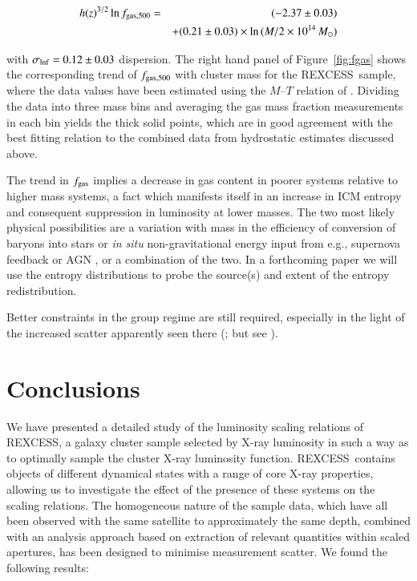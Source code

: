 \documentclass[oldversion]{aa}
\newcommand{\rexcess}{{\gwpfont REXCESS}}
\begin{document}
\begin{eqnarray*}
h(z)^{3/2} \ln{f_{\rm gas,500}} & = &(-2.37\pm0.03) \\
& & + (0.21\pm0.03) \times \ln{(M / 2\times10^{14}\, M_\odot})
\end{eqnarray*}

\noindent with $\sigma_{\rm lnf} = 0.12\pm0.03$ dispersion. The right hand panel of Figure~\ref{fig:fgas} shows the corresponding trend of $f_{\rm gas,500}$ with cluster mass for the \rexcess\ sample, where the data values have been estimated using the $M$--$T$ relation of \citet{app05}. Dividing the data into three mass bins and averaging the gas mass fraction measurements in each bin yields the thick solid points, which are in good agreement with the best fitting relation to the combined data from hydrostatic estimates discussed above. 

The trend in $f_{\rm gas}$ implies a decrease in gas content in
poorer systems relative to higher mass systems, a fact which 
manifests itself in an increase in ICM entropy and consequent suppression in luminosity at lower
masses. The two most likely physical possibilities are a variation with mass in the efficiency of conversion of baryons into stars
or {\it in situ} non-gravitational energy input from e.g., supernova feedback or AGN \citep*[e.g.][]{pss08,bmb08}, or a combination of the two. In a forthcoming paper we will use the entropy distributions to probe the source(s) and extent of the entropy redistribution.

Better constraints in the group regime are still required, especially in the light of the increased scatter apparently seen there (\citealt{op04}; but see \citealt{sun08}).



\section{Conclusions}

We have presented a detailed study of the luminosity scaling relations
of \rexcess, a galaxy cluster sample selected by X-ray luminosity in
such a way as to optimally sample the cluster X-ray luminosity
function. \rexcess\ contains objects of different dynamical states
with a range of core X-ray properties, allowing us to investigate
the effect of the presence of these systems on the scaling
relations. The homogeneous nature of the sample data, which have all
been observed with the same satellite to approximately the same depth, combined with an analysis approach based on extraction of relevant quantities within
scaled apertures, has been designed to minimise measurement scatter. 
We found the following results:
\end{document}
